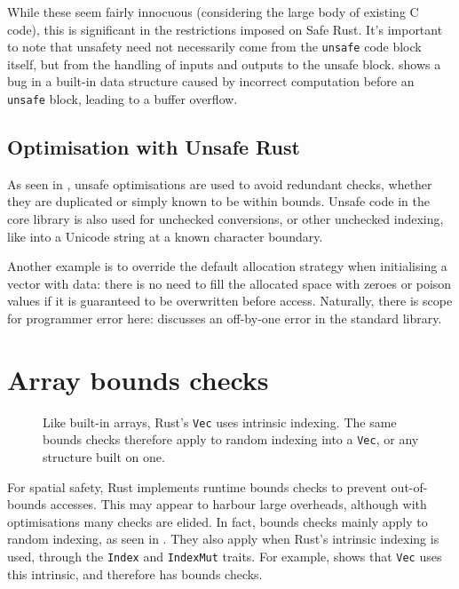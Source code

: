 \documentclass[dissertation.tex]{subfiles}
\begin{document}
While these seem fairly innocuous (considering the large body of
existing C code), this is significant in the restrictions imposed on
Safe Rust.
It's important to note that unsafety need not necessarily come from
the \texttt{unsafe} code block itself, but from the handling of inputs
and outputs to the unsafe block.
 shows a bug in a built-in data structure
caused by incorrect computation before an \texttt{unsafe} block, leading
to a buffer overflow.

\subsection{Optimisation with Unsafe Rust}
As seen in , unsafe optimisations are used to
avoid redundant checks, whether they are duplicated or simply known to
be within bounds.
Unsafe code in the core library is also used for unchecked conversions,
or other unchecked indexing, like into a Unicode string at a known
character boundary.

Another example is to override the default allocation strategy
when initialising a vector with data: there is no need to fill the
allocated space with zeroes or poison values if it is guaranteed to be
overwritten before access.
Naturally, there is scope for programmer error here:
 discusses an off-by-one error in
the standard library.


\section{Array bounds checks}
\label{sec:rust-elision}

\begin{figure}[ht]
    
    \caption{
        Like built-in arrays, Rust's \texttt{Vec} uses intrinsic
        indexing.
        The same bounds checks therefore apply to random indexing into a
        \texttt{Vec}, or any structure built on one.
    }
    \label{lst:rust-vec-index}
\end{figure}

For spatial safety, Rust implements runtime bounds checks to
prevent out-of-bounds accesses.
This may appear to harbour large overheads, although with optimisations
many checks are elided.
In fact, bounds checks mainly apply to random indexing, as seen in
.
They also apply when Rust's intrinsic indexing is used, through the
\texttt{Index} and \texttt{IndexMut} traits.
For example,  shows that \texttt{Vec} uses
this intrinsic, and therefore has bounds checks.
\end{document}
